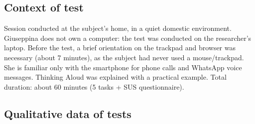 ﻿\documentclass[11pt,a4paper]{article}
\begin{document}
\subsection*{Context of test}
\begin{tcolorbox}[base]
Session conducted at the subject's home, in a quiet
domestic environment. Giuseppina does not own a
computer: the test was conducted on the researcher's laptop.
Before the test, a brief orientation on the
trackpad and browser was necessary (about 7 minutes), as the subject
had never used a mouse/trackpad. She is familiar
only with the smartphone for phone calls and WhatsApp voice messages.
Thinking Aloud was explained with a practical example.
Total duration: about 60 minutes (5 tasks + SUS questionnaire).
\end{tcolorbox}

\subsection*{Qualitative data of tests}
\end{document}
